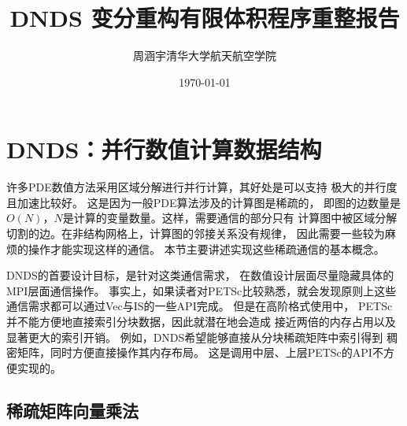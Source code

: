 \documentclass[UTF8,zihao=5]{ctexart} %
\title{{\bfseries\rmfamily\Huge{DNDS 变分重构有限体积程序重整报告}}}
\author{周涵宇\hspace{2em}清华大学航天航空学院}
\date{\today}
\begin{document}
\null  %
\nointerlineskip  %
\vfill
\let\snewpage \newpage
\let\newpage \relax
\maketitle
\let \newpage \snewpage
\vfill 
\break %


\thispagestyle{empty}
\newpage




\begin{center}
    \rmfamily
    \tableofcontents\setcounter{page}{0}
\end{center}
\thispagestyle{empty}
\newpage



\section{DNDS：并行数值计算数据结构}

许多PDE数值方法采用区域分解进行并行计算，其好处是可以支持
极大的并行度且加速比较好。
这是因为一般PDE算法涉及的计算图是稀疏的，
即图的边数量是$O(N)$，$N$是计算的变量数量。这样，需要通信的部分只有
计算图中被区域分解切割的边。在非结构网格上，计算图的邻接关系没有规律，
因此需要一些较为麻烦的操作才能实现这样的通信。
本节主要讲述实现这些稀疏通信的基本概念。

DNDS的首要设计目标，是针对这类通信需求，
在数值设计层面尽量隐藏具体的MPI层面通信操作。
事实上，如果读者对PETSc\cite{petsc-web-page}比较熟悉，就会发现原则上这些
通信需求都可以通过Vec与IS的一些API完成。
但是在高阶格式使用中，
PETSc并不能方便地直接索引分块数据，因此就潜在地会造成
接近两倍的内存占用以及显著更大的索引开销。
例如，DNDS希望能够直接从分块稀疏矩阵中索引得到
稠密矩阵，同时方便直接操作其内存布局。
这是调用中层、上层PETSc的API不方便实现的。




\subsection{稀疏矩阵向量乘法}
\label{ssec:sparse_mat}
\end{document}
